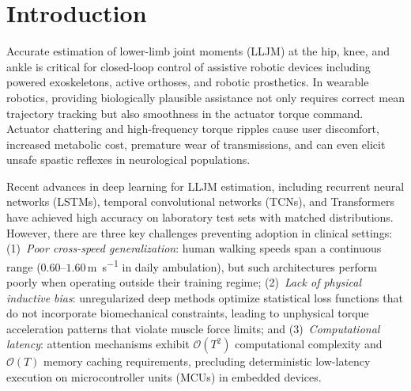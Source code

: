 \documentclass[fleqn,10pt]{wlscirep}
\begin{document}
\section{Introduction}

Accurate estimation of lower-limb joint moments (LLJM) at the hip, knee, and ankle is critical for closed-loop control of assistive robotic devices including powered exoskeletons, active orthoses, and robotic prosthetics\cite{lim2019review}. In wearable robotics, providing biologically plausible assistance not only requires correct mean trajectory tracking but also smoothness in the actuator torque command\cite{tucker2015control}. Actuator chattering and high-frequency torque ripples cause user discomfort, increased metabolic cost, premature wear of transmissions, and can even elicit unsafe spastic reflexes in neurological populations\cite{tucker2015control, baud2021review}.

Recent advances in deep learning for LLJM estimation, including recurrent neural networks (LSTMs)\cite{mundt2020prediction, johnson2021comparison}, temporal convolutional networks (TCNs)\cite{molinaro2024estimating}, and Transformers\cite{sharifi2023biomat, hossain2023estimation} have achieved high accuracy on laboratory test sets with matched distributions. However, there are three key challenges preventing adoption in clinical settings: (1)~\emph{Poor cross-speed generalization}: human walking speeds span a continuous range ($0.60$--$1.60$\,\si{\metre\per\second} in daily ambulation\cite{bohannon2011comfortable}), but such architectures perform poorly when operating outside their training regime; (2)~\emph{Lack of physical inductive bias}: unregularized deep methods optimize statistical loss functions that do not incorporate biomechanical constraints, leading to unphysical torque acceleration patterns that violate muscle force limits; and (3)~\emph{Computational latency}: attention mechanisms exhibit $\mathcal{O}(T^2)$ computational complexity and $\mathcal{O}(T)$ memory caching requirements, precluding deterministic low-latency execution on microcontroller units (MCUs) in embedded devices.
\end{document}
